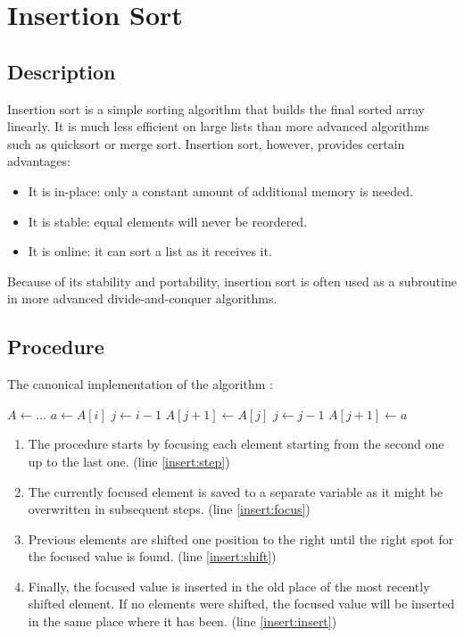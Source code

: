\documentclass[titlepage, a4paper, 12pt]{article}
\begin{document}
    \clearpage
    \section{Insertion Sort}

    \subsection{Description}

    Insertion sort is a simple sorting algorithm that builds the final sorted array linearly. It is much less efficient on large lists than more advanced algorithms such as quicksort or merge sort. Insertion sort, however, provides certain advantages:

    \begin{itemize}
        \item It is in-place: only a constant amount of additional memory is needed.
        \item It is stable: equal elements will never be reordered.
        \item It is online: it can sort a list as it receives it.
    \end{itemize}

    Because of its stability and portability, insertion sort is often used as a subroutine in more advanced divide-and-conquer algorithms.

    \subsection{Procedure}

    The canonical implementation of the algorithm \cite{cormen}:

    \begin{algorithmic}[1]
        \State $A \gets ...$
         \label{insert:step}
            \State $a \gets A[i]$ \label{insert:focus}
            \State $j \gets i - 1$
             \label{insert:shift}
                \State $A[j + 1] \gets A[j]$
                \State $j \gets j - 1$
            \EndWhile
            \State $A[j + 1] \gets a$ \label{insert:insert}
        \EndFor
    \end{algorithmic}

    \begin{enumerate}
        \item The procedure starts by focusing each element starting from the second one up to the last one. (line \ref{insert:step})
        \item The currently focused element is saved to a separate variable as it might be overwritten in subsequent steps. (line \ref{insert:focus})
        \item Previous elements are shifted one position to the right until the right spot for the focused value is found. (line \ref{insert:shift})
        \item Finally, the focused value is inserted in the old place of the most recently shifted element. If no elements were shifted, the focused value will be inserted in the same place where it has been. (line \ref{insert:insert})
    \end{enumerate}
\end{document}
